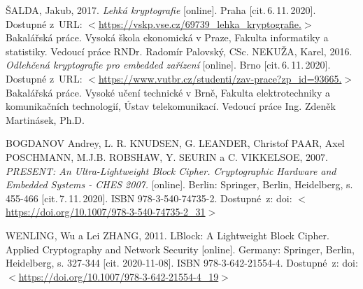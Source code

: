 \begin{thebibliography}{99}
    \label{SaldaBP}
    ŠALDA, Jakub, 
    2017. 
    \emph{Lehká kryptografie} 
    [online]. 
    Praha 
    [cit.\,6.\,11.\,2020]. 
    Dostupné z~URL: \(<\)\url{https://vskp.vse.cz/69739_lehka_kryptografie.}\(>\) 
    Bakalářská práce. 
    Vysoká škola ekonomická v Praze, Fakulta informatiky a statistiky. 
    Vedoucí práce RNDr. Radomír Palovský, CSc.
    \label{source:NekuzaBP}
    NEKUŽA, Karel, 
    2016. 
    \emph{Odlehčená kryptografie pro embedded zařízení} 
    [online]. 
    Brno 
    [cit.\,6.\,11.\,2020].
    Dostupné z~URL: \(<\)\url{https://www.vutbr.cz/studenti/zav-prace?zp_id=93665.}\(>\)
    Bakalářská práce. 
    Vysoké učení technické v Brně, 
    Fakulta elektrotechniky a komunikačních technologií, Ústav telekomunikací. 
    Vedoucí práce Ing. Zdeněk Martinásek, Ph.D.
   
    \label{source:PRESENT}
    BOGDANOV Andrey, L. R. KNUDSEN, G. LEANDER, Christof PAAR, Axel POSCHMANN, M.J.B. ROBSHAW, Y. SEURIN a C. VIKKELSOE, 
    2007. 
    \emph{PRESENT: An Ultra-Lightweight Block Cipher. Cryptographic Hardware and Embedded Systems - CHES 2007.}
    [online]. 
    Berlin: Springer, Berlin, Heidelberg, 
    s. 455-466 
    [cit.\,7.\,11.\,2020]. 
    ISBN 978-3-540-74735-2. 
    Dostupné~z: doi: \(<\)\url{https://doi.org/10.1007/978-3-540-74735-2_31}\(>\)
    
    \label{source:lblock}
    WENLING, Wu a Lei ZHANG, 
    2011.
    LBlock: A Lightweight Block Cipher. Applied Cryptography and Network Security 
    [online]. 
    Germany: Springer, Berlin, Heidelberg, 
    s. 327-344 
    [cit. 2020-11-08]. 
    ISBN 978-3-642-21554-4. 
    Dostupné~z: doi: \(<\)\url{https://doi.org/10.1007/978-3-642-21554-4_19}\(>\)

\end{thebibliography}


%
%
%
